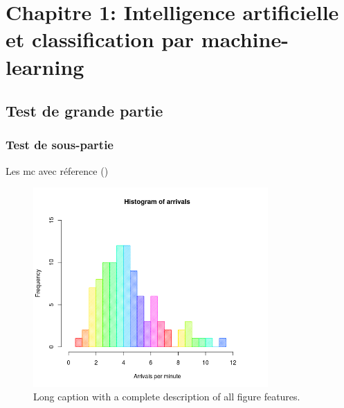 \chapter*{Chapitre 1: Intelligence artificielle et classification par machine-learning}
\section{Test de grande partie}
\subsection{Test de sous-partie}
Les \gls{mc} avec réference (\cite{habehh_machine_2021})
\begin{figure}[htbp]
  \centering
  \includegraphics[width=0.8\textwidth]{figures/figure1.png}
  \caption[Short caption]{Long caption with a complete description of all figure features.}
  \label{fig:figure-label}
\end{figure}